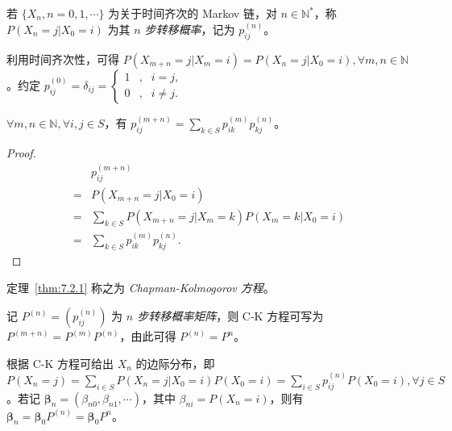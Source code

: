 \documentclass[../main.tex]{subfiles}
\begin{document}
\begin{definition}\label{def:7.2.1}
    若 $\{X_n,n=0,1,\cdots\}$ 为关于时间齐次的 Markov 链，对 $n\in\mathbb N^*$，称 $P(X_n=j|X_0=i)$ 为其 \emph{$n$ 步转移概率}，记为 $p_{ij}^{(n)}$。
\end{definition}

利用时间齐次性，可得 $P(X_{m+n}=j|X_m=i)=P(X_n=j|X_0=i),\forall m,n\in\mathbb N$。约定 $p_{ij}^{(0)}=\delta_{ij}=
    \left\{\begin{aligned}
        1 & , & i=j,     \\
        0 & , & i\neq j.
    \end{aligned}\right.$

\begin{theorem}\label{thm:7.2.1}
    $\forall m,n\in\mathbb N,\forall i,j\in S$，有 $p_{ij}^{(m+n)}=\sum_{k\in S}p_{ik}^{(m)}p_{kj}^{(n)}$。
\end{theorem}

\begin{proof}
    \begin{equation*}
        \begin{aligned}
              & p_{ij}^{(m+n)}                                \\
            = & P(X_{m+n}=j|X_0=i)                            \\
            = & \sum_{k\in S}P(X_{m+n}=j|X_m=k)P(X_m=k|X_0=i) \\
            = & \sum_{k\in S}p_{ik}^{(m)}p_{kj}^{(n)}.
        \end{aligned}
    \end{equation*}
\end{proof}

定理~\ref{thm:7.2.1} 称之为 \emph{Chapman-Kolmogorov 方程}。

记 $P^{(n)}=(p_{ij}^{(n)})$ 为 \emph{$n$ 步转移概率矩阵}，则 C-K 方程可写为 $P^{(m+n)}=P^{(m)}P^{(n)}$，由此可得 $P^{(n)}=P^n$。

根据 C-K 方程可给出 $X_n$ 的边际分布，即 $P(X_n=j)=\sum_{i\in S}P(X_n=j|X_0=i)P(X_0=i)=\sum_{i\in S}p_{ij}^{(n)}P(X_0=i),\forall j\in S$。若记 $\boldsymbol\beta_n=(\beta_{n0},\beta_{n1},\cdots)$，其中 $\beta_{ni}=P(X_n=i)$，则有 $\boldsymbol\beta_n=\boldsymbol\beta_0P^{(n)}=\boldsymbol\beta_0P^n$。
\end{document}
